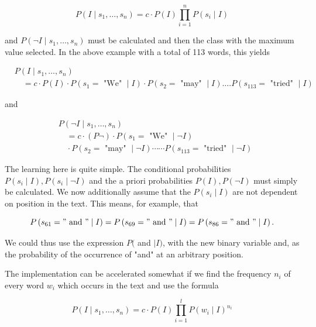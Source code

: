 \documentclass[10pt]{book}
\begin{document}
\begin{center}
\begin{enumerate}
\begin{center}
\begin{center}
\begin{center}
\begin{equation*}
P\left(I \mid s_{1}, \ldots, s_{n}\right)=c \cdot P(I) \prod_{i=1}^{n} P\left(s_{i} \mid I\right) \tag{8.9}
\end{equation*}


and $P\left(\neg I \mid s_{1}, \ldots, s_{n}\right)$ must be calculated and then the class with the maximum value selected. In the above example with a total of 113 words, this yields

$$
\begin{aligned}
& P\left(I \mid s_{1}, \ldots, s_{n}\right) \\
& \quad=c \cdot P(I) \cdot P\left(s_{1}=\text { "We" } \mid I\right) \cdot P\left(s_{2}=\text { "may" } \mid I\right) \ldots . P\left(s_{113}=\text { "tried" } \mid I\right)
\end{aligned}
$$

and

$$
\begin{aligned}
& P\left(\neg I \mid s_{1}, \ldots, s_{n}\right) \\
& \quad=c \cdot(P \neg) \cdot P\left(s_{1}=\text { "We" } \mid \neg I\right) \\
& \quad \cdot P\left(s_{2}=\text { "may" } \mid \neg I\right) \cdots \cdots P\left(s_{113}=\text { "tried" } \mid \neg I\right)
\end{aligned}
$$

The learning here is quite simple. The conditional probabilities $P\left(s_{i} \mid I\right), P\left(s_{i} \mid \neg I\right)$ and the a priori probabilities $P(I), P(\neg I)$ must simply be calculated. We now additionally assume that the $P\left(s_{i} \mid I\right)$ are not dependent on position in the text. This means, for example, that

$$
P\left(s_{61}=" \text { and } " \mid I\right)=P\left(s_{69}=" \text { and } " \mid I\right)=P\left(s_{86}=" \text { and } " \mid I\right) .
$$

We could thus use the expression $P($ and $\mid I)$, with the new binary variable and, as the probability of the occurrence of "and" at an arbitrary position.

The implementation can be accelerated somewhat if we find the frequency $n_{i}$ of every word $w_{i}$ which occurs in the text and use the formula


\begin{equation*}
P\left(I \mid s_{1}, \ldots, s_{n}\right)=c \cdot P(I) \prod_{i=1}^{l} P\left(w_{i} \mid I\right)^{n_{i}} \tag{8.10}
\end{equation*}



\end{center}
\end{center}
\end{center}
\end{enumerate}
\end{center}
\end{document}
